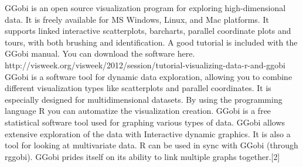 GGobi is an open source visualization program for exploring high-dimensional data.
It is freely available for MS Windows, Linux, and Mac platforms. It supports linked interactive scatterplots, barcharts, parallel coordinate plots and tours, with both brushing and identification. 
A good tutorial is included with the GGobi manual. You can download the software here.
http://visweek.org/visweek/2012/session/tutorial-visualizing-data-r-and-ggobi
GGobi is a software tool for dynamic data exploration, allowing you to combine different visualization types like scatterplots and parallel coordinates. It is especially designed for multidimensional datasets. By using the programming language R you can automatize the visualization creation.
GGobi is a free statistical software tool used for graphing various types of data. GGobi allows extensive exploration of the data with Interactive dynamic graphics. It is also a tool for looking at multivariate data. R can be used in sync with GGobi (through rggobi). GGobi prides itself on its ability to link multiple graphs together.[2]

